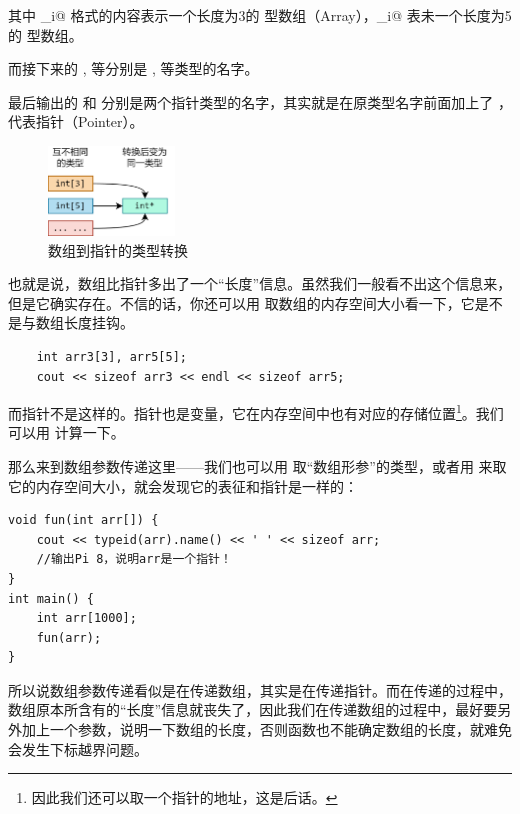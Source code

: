 其中 _i@ 格式的内容表示一个长度为3的 \lstinline@int@ 型数组（Array），_i@ 表未一个长度为5的 \lstinline@int@ 型数组。\par
而接下来的 \lstinline@i@, \lstinline@d@ 等分别是 \lstinline@int@, \lstinline@double@ 等类型的名字。\par
最后输出的 \lstinline@Pi@ 和 \lstinline@Pc@ 分别是两个指针类型的名字，其实就是在原类型名字前面加上了 \lstinline@P@ ，代表指针（Pointer）。\par
\begin{figure}[htbp]
    \centering
    \includegraphics[width=0.3\textwidth]{../images/generalized_parts/05_array_to_pointer_conversion_300.png}
    \caption{数组到指针的类型转换}    
\end{figure}
也就是说，数组比指针多出了一个``长度''信息。虽然我们一般看不出这个信息来，但是它确实存在。不信的话，你还可以用 \lstinline@sizeof@ 取数组的内存空间大小看一下，它是不是与数组长度挂钩。
\begin{lstlisting}
    int arr3[3], arr5[5];
    cout << sizeof arr3 << endl << sizeof arr5;
\end{lstlisting}
而指针不是这样的。指针也是变量，它在内存空间中也有对应的存储位置\footnote{因此我们还可以取一个指针的地址，这是后话。}。我们可以用 \lstinline@sizeof@ 计算一下。\par
那么来到数组参数传递这里——我们也可以用 \lstinline@typeid@ 取``数组形参''的类型，或者用 \lstinline@sizeof@ 来取它的内存空间大小，就会发现它的表征和指针是一样的：
\begin{lstlisting}
void fun(int arr[]) {
    cout << typeid(arr).name() << ' ' << sizeof arr;
    //输出Pi 8，说明arr是一个指针！
}
int main() {
    int arr[1000];
    fun(arr);
}
\end{lstlisting}\par
所以说数组参数传递看似是在传递数组，其实是在传递指针。而在传递的过程中，数组原本所含有的``长度''信息就丧失了，因此我们在传递数组的过程中，最好要另外加上一个参数，说明一下数组的长度，否则函数也不能确定数组的长度，就难免会发生下标越界问题。\par
